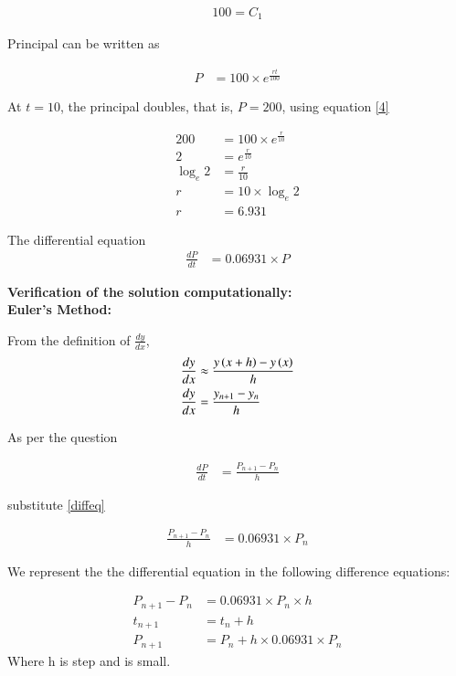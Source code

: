\documentclass[journal]{IEEEtran}
\numberwithin{equation}{enumi}
\numberwithin{figure}{enumi}
\begin{document}
\begin{align}
    100 = C_1
\end{align}

Principal can be written as

\begin{align}
    P &= 100 \times e^{\frac{rt}{100}} \label{4}
\end{align}

At $t = 10$, the principal doubles, that is, $P = 200$, using equation \eqref{4}

\begin{align}
    200 &= 100 \times e^{\frac{r}{10}}\\
    2 &= e^{\frac{r}{10}}\\
    \log_e{2} &= \frac{r}{10}\\
    r &= 10 \times \log_e{2}\\
    r &= 6.931
\end{align}

The differential equation 
\begin{align}
    \frac{dP}{dt} &= 0.06931 \times P \label{diffeq}
\end{align}

\textbf{Verification of the solution computationally:}\\
\textbf{Euler's Method:}

From the definition of $\frac{dy}{dx}$,
\begin{align}
    \frac{dy}{dx} &\approx \frac{y\left(x + h\right) - y\left(x\right)}{h}\\
    \frac{dy}{dx} &= \frac{y_{n+1} - y_n}{h}
\end{align}

As per the question

\begin{align}
    \frac{dP}{dt} &= \frac{P_{n+1} - P_n}{h}
\end{align}

substitute \eqref{diffeq}

\begin{align}
    \frac{P_{n+1} - P_n}{h} &= 0.06931\times P_n
\end{align}

We represent the the differential equation in the following difference equations:

\begin{align}
    P_{n+1} - P_n &= 0.06931\times P_n \times h\\
    t_{n+1} &= t_{n}+h \\
    P_{n+1} &= P_{n}+h \times 0.06931 \times P_n
\end{align}
Where h is step and is small.
\end{document}
